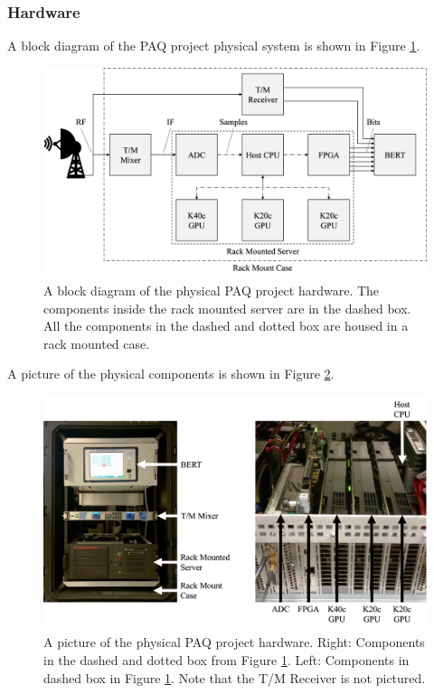 \subsubsection{Hardware}
\label{sec:hardware}
A block diagram of the PAQ project physical system is shown in Figure \ref{fig:hardwareblock}.
\begin{figure}
	\centering\includegraphics[width=11.58in/100*55]{figures/systemOverview/hardwareblock.pdf}
	\caption{A block diagram of the physical PAQ project hardware. The components inside the rack mounted server are in the dashed box. All the components in the dashed and dotted box are housed in a rack mounted case.}
	\label{fig:hardwareblock}
\end{figure}
A picture of the physical components is shown in Figure \ref{fig:HostSystem}.
\begin{figure}
	\centering\includegraphics[scale=0.55]{figures/systemOverview/HostSystem.jpg}
	\caption{A picture of the physical PAQ project hardware. Right: Components in the dashed and dotted box from Figure \ref{fig:hardwareblock}. Left: Components in dashed box in Figure \ref{fig:hardwareblock}. Note that the T/M Receiver is not pictured.}
	\label{fig:HostSystem}
\end{figure}
